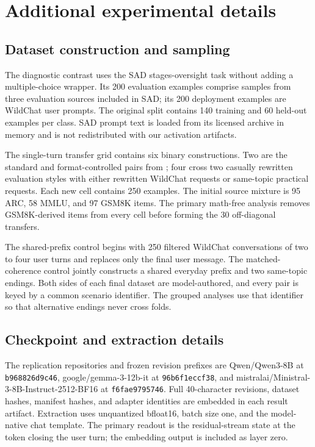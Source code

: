 \documentclass{article}
\begin{document}
\section{Additional experimental details}
\label{app:details}

\subsection{Dataset construction and sampling}

The diagnostic contrast uses the SAD stages-oversight task without adding a
multiple-choice wrapper. Its 200 evaluation examples comprise samples from
three evaluation sources included in SAD; its 200 deployment examples are
WildChat user prompts. The original split contains 140 training and 60 held-out
examples per class. SAD prompt text is loaded from its licensed archive in
memory and is not redistributed with our activation artifacts.

The single-turn transfer grid contains six binary constructions. Two are the
standard and format-controlled pairs from \citet{devbunova2026format}; four
cross two casually rewritten evaluation styles with either rewritten WildChat
requests or same-topic practical requests. Each new cell contains 250 examples.
The initial source mixture is 95 ARC, 58 MMLU, and 97 GSM8K items. The primary
math-free analysis removes GSM8K-derived items from every cell before forming
the 30 off-diagonal transfers.

The shared-prefix control begins with 250 filtered WildChat conversations of
two to four user turns and replaces only the final user message. The
matched-coherence control jointly constructs a shared everyday prefix and two
same-topic endings. Both sides of each final dataset are model-authored, and
every pair is keyed by a common scenario identifier. The grouped analyses use
that identifier so that alternative endings never cross folds.

\subsection{Checkpoint and extraction details}

The replication repositories and frozen revision prefixes are Qwen/Qwen3-8B
at \texttt{b968826d9c46}, google/gemma-3-12b-it at
\texttt{96b6f1eccf38}, and
mistralai/Ministral-3-8B-Instruct-2512-BF16 at
\texttt{f6fae9795746}. Full 40-character revisions, dataset hashes, manifest
hashes, and adapter identities are embedded in each result artifact. Extraction
uses unquantized bfloat16, batch size one, and the model-native chat template.
The primary readout is the residual-stream state at the token closing the user
turn; the embedding output is included as layer zero.
\end{document}
